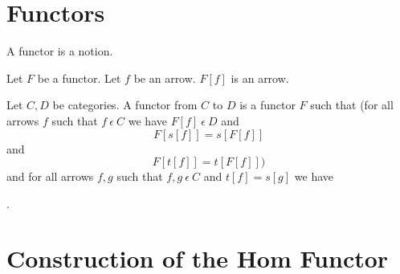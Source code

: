 \documentclass{article}
\newcommand{\mcirc}{\circ_{c}}
\newcommand{\inn}{~\epsilon~}
\begin{document}
	\section{Functors}
	
	\begin{forthel}
		
		\begin{signature} A functor is a notion.
		\end{signature}
		
		\begin{signature} Let $F$ be a functor. Let $f$ be an arrow. $F[f]$ is an arrow.
		\end{signature}
		
		\begin{definition}
			Let $C,D$ be categories.
			A functor from $C$ to $D$ is a functor $F$ such that
			(for all arrows $f$ such that $f \inn C$ we have
			$F[f] \inn D$
			and $$F[s[f]] = s[F[f]]$$
			and $$F[t[f]] = t[F[f]])$$
			and for all arrows $f,g$ such that $f,g \inn C$ and $t[f]=s[g]$ we have
			\begin{center}
				.
			\end{center}
		\end{definition}
		
	\end{forthel}
	
	\section{Construction of the Hom Functor}
	
\end{document}
